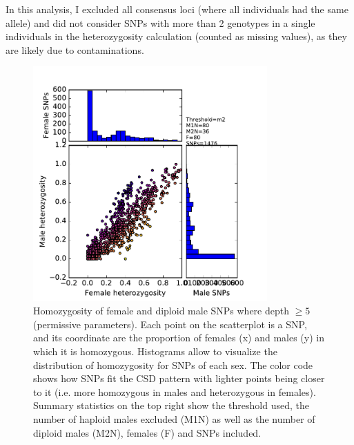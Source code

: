 \documentclass[10pt,a4paper]{report}
\begin{document}
In this analysis, I excluded all consensus loci (where all individuals had the same allele) and did not consider SNPs with more than 2 genotypes in a single individuals in the heterozygosity calculation (counted as missing values), as they are likely due to contaminations.

\begin{figure}[h]
	\begin{center}
		\includegraphics[width=0.8\textwidth]{exclu_haplo/d5assoc_explo/m2}
		\caption{Homozygosity of female and diploid male SNPs where depth $\geq 5$ (permissive parameters). Each point on the scatterplot is a SNP, and its coordinate are the proportion of females (x) and males (y) in which it is homozygous. Histograms allow to visualize the distribution of homozygosity for SNPs of each sex. The color code shows how SNPs fit the CSD pattern with lighter points being closer to it (i.e. more homozygous in males and heterozygous in females). Summary statistics on the top right show the threshold used, the number of haploid males excluded (M1N) as well as the number of diploid males (M2N), females (F) and SNPs included.}
		\label{SNPs_explo5}
	\end{center}
\end{figure}
\end{document}
